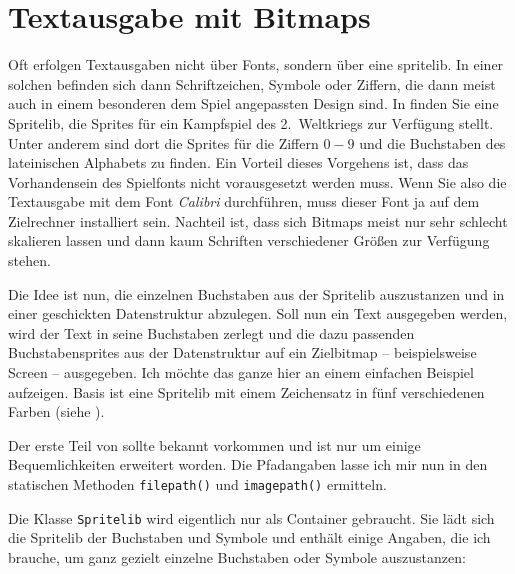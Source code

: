 \newpage
\section{Textausgabe mit Bitmaps}
Oft erfolgen Textausgaben nicht über Fonts, sondern über eine \gls{spritelib}. In einer solchen befinden sich dann Schriftzeichen, Symbole oder Ziffern, die dann meist auch in einem besonderen dem Spiel angepassten Design sind. In  finden Sie eine Spritelib, die Sprites für ein Kampfspiel des 2.~Weltkriegs zur Verfügung stellt. Unter anderem sind dort die Sprites für die Ziffern $0-9$ und die Buchstaben des lateinischen Alphabets zu finden. Ein Vorteil dieses Vorgehens ist, dass das Vorhandensein des Spielfonts nicht vorausgesetzt werden muss. Wenn Sie also die Textausgabe mit dem Font \emph{Calibri} durchführen, muss dieser Font ja auf dem Zielrechner installiert sein. Nachteil ist, dass sich Bitmaps meist nur sehr schlecht skalieren lassen und dann kaum Schriften verschiedener Größen zur Verfügung stehen. 

Die Idee ist nun, die einzelnen Buchstaben aus der Spritelib auszustanzen und in einer geschickten Datenstruktur abzulegen. Soll nun ein Text ausgegeben werden, wird der Text in seine Buchstaben zerlegt und die dazu passenden Buchstabensprites aus der Datenstruktur auf ein Zielbitmap -- beispielsweise Screen -- ausgegeben. Ich möchte das ganze hier an einem einfachen Beispiel aufzeigen. Basis ist eine Spritelib mit einem Zeichensatz in fünf verschiedenen Farben (siehe ).


Der erste Teil von  sollte bekannt vorkommen und ist nur um einige Bequemlichkeiten erweitert worden. Die Pfadangaben lasse ich mir nun in den statischen Methoden \texttt{filepath()} und \texttt{imagepath()} ermitteln.


Die Klasse \texttt{Spritelib} wird eigentlich nur als Container gebraucht. Sie lädt sich die Spritelib der Buchstaben und Symbole und enthält einige Angaben, die ich brauche, um ganz gezielt einzelne Buchstaben oder Symbole auszustanzen:

